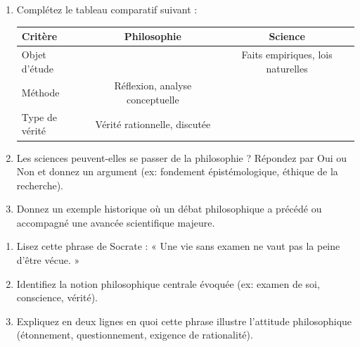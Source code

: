 \documentclass[11pt]{article}
\begin{document}
\begin{exercice}
\begin{enumerate}
    \item Complétez le tableau comparatif suivant :
    \begin{tabular}{|l|c|c|}
    \hline
    \textbf{Critère} & \textbf{Philosophie} & \textbf{Science} \\
    \hline
    Objet d'étude & \underline{\hspace{3cm}} & Faits empiriques, lois naturelles \\
    \hline
    Méthode & Réflexion, analyse conceptuelle & \underline{\hspace{3cm}} \\
    \hline
    Type de vérité & Vérité rationnelle, discutée & \underline{\hspace{3cm}} \\
    \hline
    \end{tabular}
    \item Les sciences peuvent-elles se passer de la philosophie ? Répondez par Oui ou Non et donnez un argument (ex: fondement épistémologique, éthique de la recherche).
    \item Donnez un exemple historique où un débat philosophique a précédé ou accompagné une avancée scientifique majeure.
\end{enumerate}
\end{exercice}

\begin{exercice}
\begin{enumerate}
    \item Lisez cette phrase de Socrate : « Une vie sans examen ne vaut pas la peine d'être vécue. »
    \item Identifiez la notion philosophique centrale évoquée (ex: examen de soi, conscience, vérité).
    \item Expliquez en deux lignes en quoi cette phrase illustre l'attitude philosophique (étonnement, questionnement, exigence de rationalité).
\end{enumerate}
\end{exercice}
\end{document}
